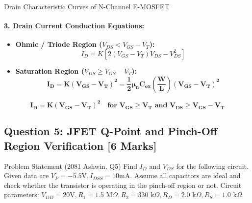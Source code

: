 \documentclass[11pt,a4paper,oneside]{book}
\begin{document}
\begin{schematicbox}{Drain Characteristic Curves of N-Channel E-MOSFET}
\centering
{}
\end{schematicbox}

\paragraph{3. Drain Current Conduction Equations:}
\begin{itemize}[leftmargin=1.5em]
  \item \textbf{Ohmic / Triode Region ($V_{DS} < V_{GS} - V_T$):}
  \[
  I_D = K \left[2(V_{GS} - V_T)V_{DS} - V_{DS}^2\right]
  \]
  \item \textbf{Saturation Region ($V_{DS} \ge V_{GS} - V_T$):}
  \[
  \mathbf{I_D = K (V_{GS} - V_T)^2 = \frac{1}{2}\mu_n C_{ox} \left(\frac{W}{L}\right)(V_{GS} - V_T)^2}
  \]
\end{itemize}

\begin{answerbox}
$$\mathbf{I_D = K(V_{GS} - V_T)^2 \quad \text{for } V_{GS} \ge V_T \text{ and } V_{DS} \ge V_{GS} - V_T}$$
\end{answerbox}

\vspace{0.6cm}

\subsection{Question 5: JFET Q-Point and Pinch-Off Region Verification [6 Marks]}
\begin{questionbox}{Problem Statement (2081 Ashwin, Q5)}
Find $I_D$ and $V_{DS}$ for the following circuit. Given data are $V_P = -5.5\text{V}, I_{DSS} = 10\text{mA}$. Assume all capacitors are ideal and check whether the transistor is operating in the pinch-off region or not.
Circuit parameters: $V_{DD} = 20\text{V}, R_1 = 1.5\text{ M}\Omega, R_2 = 330\text{ k}\Omega, R_D = 2.0\text{ k}\Omega, R_S = 1.0\text{ k}\Omega$.
\end{questionbox}
\end{document}
